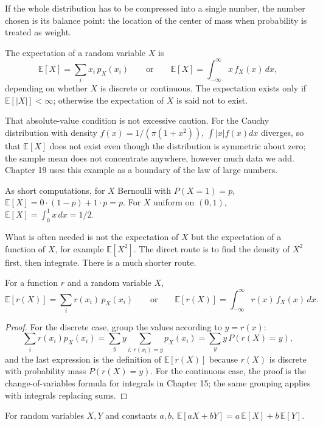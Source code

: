 If the whole distribution has to be compressed into a single number, the number chosen
is its balance point: the location of the center of mass when probability is treated as weight.

\begin{definisi}[Expectation]
The expectation of a random variable $X$ is
\[
\mathbb{E}[X]=\sum_i x_i\,p_X(x_i)
\qquad\text{or}\qquad
\mathbb{E}[X]=\int_{-\infty}^{\infty}x\,f_X(x)\,dx,
\]
depending on whether $X$ is discrete or continuous. The expectation exists only if
$\mathbb{E}[|X|]<\infty$; otherwise the expectation of $X$ is said not to exist.
\end{definisi}

That absolute-value condition is not excessive caution. For the Cauchy distribution with
density $f(x)=1/(\pi(1+x^2))$, $\int|x|f(x)dx$ diverges, so that $\mathbb{E}[X]$
does not exist even though the distribution is symmetric about zero; the sample mean does not
concentrate anywhere, however much data we add. Chapter 19 uses this example
as a boundary of the law of large numbers.

As short computations, for $X$ Bernoulli with $P(X=1)=p$,
$\mathbb{E}[X]=0\cdot(1-p)+1\cdot p=p$. For $X$ uniform on $(0,1)$,
$\mathbb{E}[X]=\int_0^1x\,dx=1/2$.

What is often needed is not the expectation of $X$ but the expectation of a function of $X$, for example
$\mathbb{E}[X^2]$. The direct route is to find the density of $X^2$ first, then
integrate. There is a much shorter route.

\begin{teorema}
For a function $r$ and a random variable $X$,
\[
\mathbb{E}[r(X)]=\sum_i r(x_i)\,p_X(x_i)
\qquad\text{or}\qquad
\mathbb{E}[r(X)]=\int_{-\infty}^{\infty}r(x)\,f_X(x)\,dx .
\]
\end{teorema}

\begin{proof}
For the discrete case, group the values according to $y=r(x)$:
\[
\sum_i r(x_i)p_X(x_i)=\sum_y y\sum_{i:\,r(x_i)=y}p_X(x_i)=\sum_y y\,P(r(X)=y),
\]
and the last expression is the definition of $\mathbb{E}[r(X)]$ because $r(X)$ is discrete with
probability mass $P(r(X)=y)$. For the continuous case, the proof is the change-of-variables
formula for integrals in Chapter 15; the same grouping applies with integrals
replacing sums.
\end{proof}

\begin{proposisi}
For random variables $X,Y$ and constants $a,b$,
$\mathbb{E}[aX+bY]=a\,\mathbb{E}[X]+b\,\mathbb{E}[Y]$.
\end{proposisi}

